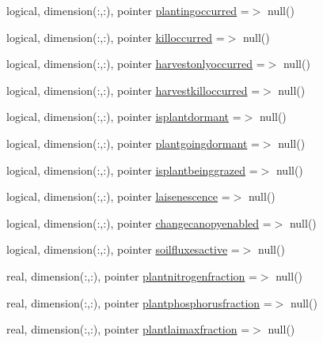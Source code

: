 \begin{DoxyCompactItemize}
\item 
logical, dimension(\+:,\+:), pointer \mbox{\hyperlink{structmodulevegetation_1_1t__vegetation_aa80398eea43faa95886188a50530e588}{plantingoccurred}} =$>$ null()
\item 
logical, dimension(\+:,\+:), pointer \mbox{\hyperlink{structmodulevegetation_1_1t__vegetation_a5ad4f8d2561048c0ece7f17f4b075798}{killoccurred}} =$>$ null()
\item 
logical, dimension(\+:,\+:), pointer \mbox{\hyperlink{structmodulevegetation_1_1t__vegetation_a3b520e497acb298b15be7ab4d24fb875}{harvestonlyoccurred}} =$>$ null()
\item 
logical, dimension(\+:,\+:), pointer \mbox{\hyperlink{structmodulevegetation_1_1t__vegetation_ae8431e7ad1245c381c994ba9899fb4b6}{harvestkilloccurred}} =$>$ null()
\item 
logical, dimension(\+:,\+:), pointer \mbox{\hyperlink{structmodulevegetation_1_1t__vegetation_a8a2efda068c602098640b6ac54e2a0b6}{isplantdormant}} =$>$ null()
\item 
logical, dimension(\+:,\+:), pointer \mbox{\hyperlink{structmodulevegetation_1_1t__vegetation_a1c55061509b98b7f1249d3c0fb0befde}{plantgoingdormant}} =$>$ null()
\item 
logical, dimension(\+:,\+:), pointer \mbox{\hyperlink{structmodulevegetation_1_1t__vegetation_a8581fdb908e749f3f07299d6512c4a1a}{isplantbeinggrazed}} =$>$ null()
\item 
logical, dimension(\+:,\+:), pointer \mbox{\hyperlink{structmodulevegetation_1_1t__vegetation_a8bf61b56c358b61ab35893cfcf2e3654}{laisenescence}} =$>$ null()
\item 
logical, dimension(\+:,\+:), pointer \mbox{\hyperlink{structmodulevegetation_1_1t__vegetation_ae99cfa68db94f202c8453cfc5010b4f5}{changecanopyenabled}} =$>$ null()
\item 
logical, dimension(\+:,\+:), pointer \mbox{\hyperlink{structmodulevegetation_1_1t__vegetation_a13a4d8141b72a92528620a70024dd243}{soilfluxesactive}} =$>$ null()
\item 
real, dimension(\+:,\+:), pointer \mbox{\hyperlink{structmodulevegetation_1_1t__vegetation_a41dbb41f741cd9147ca0978528eab36e}{plantnitrogenfraction}} =$>$ null()
\item 
real, dimension(\+:,\+:), pointer \mbox{\hyperlink{structmodulevegetation_1_1t__vegetation_a9a5f574ea862a82a9014e8837ea5f030}{plantphosphorusfraction}} =$>$ null()
\item 
real, dimension(\+:,\+:), pointer \mbox{\hyperlink{structmodulevegetation_1_1t__vegetation_ab1d7e81b85dff8e5d5346b5c8e9bbed7}{plantlaimaxfraction}} =$>$ null()

\end{DoxyCompactItemize}
